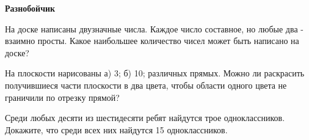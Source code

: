 \centerline{\bf \Huge Разнобойчик}

\begin{flushright}
        \scriptsize{}
\end{flushright}

На доске написаны двузначные числа. Каждое число составное, но любые два - взаимно просты. Какое наибольшее количество чисел может быть написано на доске?

На плоскости нарисованы а) 3; б) 10; различных прямых. Можно ли раскрасить получившиеся части плоскости в два цвета, чтобы области одного цвета не граничили по отрезку прямой?

Среди любых десяти из шестидесяти ребят найдутся трое одноклассников. Докажите, что среди всех них найдутся 15 одноклассников.